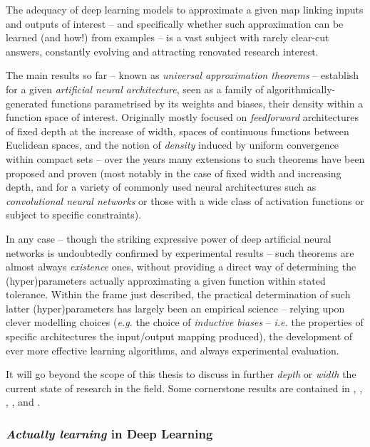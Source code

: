 The adequacy of deep learning models to approximate a given map linking inputs and outputs of interest -- and specifically whether such approximation can be learned (and how!) from examples -- is a vast subject with rarely clear-cut answers, constantly evolving and attracting renovated research interest.

The main results so far -- known as \textit{universal approximation theorems} -- establish for a given \textit{artificial neural architecture}, seen as a family of algorithmically-generated functions parametrised by its weights and biases, their density within a function space of interest. Originally mostly focused on \textit{feedforward} architectures of fixed depth at the increase of width, spaces of continuous functions between Euclidean spaces, and the notion of \textit{density} induced by uniform convergence within compact sets -- over the years many extensions to such theorems have been proposed and proven (most notably in the case of fixed width and increasing depth, and for a variety of commonly used neural architectures such as \textit{convolutional neural networks} or those with a wide class of activation functions or subject to specific constraints).

In any case -- though the striking expressive power of deep artificial neural networks is undoubtedly confirmed by experimental results -- such theorems are almost always \textit{existence} ones, without providing a direct way of determining the (hyper)parameters actually approximating a given function within stated tolerance. Within the frame just described, the practical determination of such latter (hyper)parameters has largely been an empirical science -- relying upon clever modelling choices (\textit{e.g.} the choice of \textit{inductive biases} -- \textit{i.e.} the properties of specific architectures \wrt the input/output mapping produced), the development of ever more effective learning algorithms, and always experimental evaluation.

It will go beyond the scope of this thesis to discuss in further \textit{depth} or \textit{width} the current state of research in the field. Some cornerstone results are contained in \cite{HornikEtAl1989Approx}, \cite{Hornik1991Approx}, \cite{LinEtAl2018Approx}, \cite{Xu2018ApproxGNN}, and \cite{KidgerLyons2020Approx}.


\subsubsection{\textit{Actually learning} in Deep Learning}

